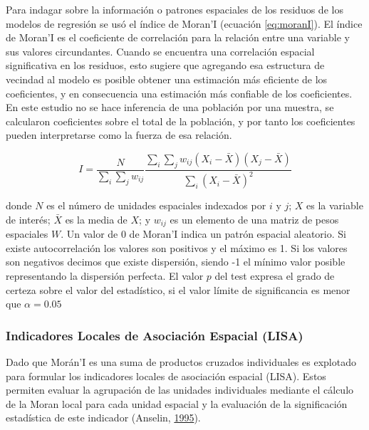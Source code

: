 \documentclass[12pt,a4paper,openany]{book}
\theoremstyle{definition}
\theoremstyle{definition}
\theoremstyle{definition}
\theoremstyle{remark}
\begin{document}
Para indagar sobre la información o patrones espaciales de los residuos
de los modelos de regresión se usó el índice de Moran'I (ecuación
\eqref{eq:moranI}). El índice de Moran'I es el coeficiente de correlación
para la relación entre una variable y sus valores circundantes. Cuando
se encuentra una correlación espacial significativa en los residuos,
esto sugiere que agregando esa estructura de vecindad al modelo es
posible obtener una estimación más eficiente de los coeficientes, y en
consecuencia una estimación más confiable de los coeficientes. En este
estudio no se hace inferencia de una población por una muestra, se
calcularon coeficientes sobre el total de la población, y por tanto los
coeficientes pueden interpretarse como la fuerza de esa relación.

\begin{equation}
 I=\frac {N}{\sum _{i}\sum _{j}w_{ij}} \frac {\sum _{i}\sum _{j}w_{ij}(X_{i}-{\bar {X}})(X_{j}-{\bar {X}})}{\sum _{i}(X_{i}- \bar{X})^{2}}
\label{eq:moranI}
\end{equation}

donde \(N\) es el número de unidades espaciales indexados por \(i\) y
\(j\); \(X\) es la variable de interés; \(\bar {X}\) es la media de
\(X\); y \(w_{ij}\) es un elemento de una matriz de pesos espaciales
\(W\). Un valor de 0 de Moran'I indica un patrón espacial aleatorio. Si
existe autocorrelación los valores son positivos y el máximo es 1. Si
los valores son negativos decimos que existe dispersión, siendo -1 el
mínimo valor posible representando la dispersión perfecta. El valor
\textbf{\(p\)} del test expresa el grado de certeza sobre el valor del
estadístico, si el valor límite de significancia es menor que
\(\alpha = 0.05\)

\subsubsection{Indicadores Locales de Asociación Espacial
(LISA)}\label{indicadores-locales-de-asociacion-espacial-lisa}

Dado que Morán'I es una suma de productos cruzados individuales es
explotado para formular los indicadores locales de asociación espacial
(LISA). Estos permiten evaluar la agrupación de las unidades
individuales mediante el cálculo de la Moran local para cada unidad
espacial y la evaluación de la significación estadística de este
indicador (Anselin, \protect\hyperlink{ref-anselin1995local}{1995}).
\end{document}
